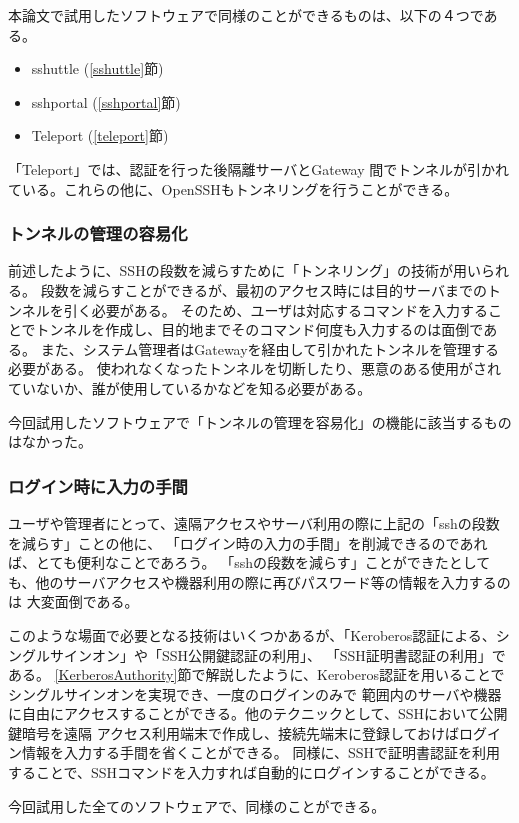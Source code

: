 \documentclass[11pt,a4j,titlepage]{jreport}
\begin{document}
\par 本論文で試用したソフトウェアで同様のことができるものは、以下の４つである。
\begin{itemize}
    \item sshuttle (\ref{sshuttle}節)
    \item sshportal (\ref{sshportal}節)
    \item Teleport (\ref{teleport}節)
\end{itemize}
「Teleport」では、認証を行った後隔離サーバとGateway
間でトンネルが引かれている。これらの他に、OpenSSHもトンネリングを行うことができる。


\subsubsection*{トンネルの管理の容易化}
前述したように、SSHの段数を減らすために「トンネリング」の技術が用いられる。
段数を減らすことができるが、最初のアクセス時には目的サーバまでのトンネルを引く必要がある。
そのため、ユーザは対応するコマンドを入力することでトンネルを作成し、目的地までそのコマンド何度も入力するのは面倒である。
また、システム管理者はGatewayを経由して引かれたトンネルを管理する必要がある。
使われなくなったトンネルを切断したり、悪意のある使用がされていないか、誰が使用しているかなどを知る必要がある。

今回試用したソフトウェアで「トンネルの管理を容易化」の機能に該当するものはなかった。


\subsubsection*{ログイン時に入力の手間}
ユーザや管理者にとって、遠隔アクセスやサーバ利用の際に上記の「sshの段数を減らす」ことの他に、
「ログイン時の入力の手間」を削減できるのであれば、とても便利なことであろう。
「sshの段数を減らす」ことができたとしても、他のサーバアクセスや機器利用の際に再びパスワード等の情報を入力するのは
大変面倒である。

このような場面で必要となる技術はいくつかあるが、「Keroberos認証による、シングルサインオン」や「SSH公開鍵認証の利用」、
「SSH証明書認証の利用」である。
\ref{KerberosAuthority}節で解説したように、Keroberos認証を用いることでシングルサインオンを実現でき、一度のログインのみで
範囲内のサーバや機器に自由にアクセスすることができる。他のテクニックとして、SSHにおいて公開鍵暗号を遠隔
アクセス利用端末で作成し、接続先端末に登録しておけばログイン情報を入力する手間を省くことができる。
同様に、SSHで証明書認証を利用することで、SSHコマンドを入力すれば自動的にログインすることができる。
\par 今回試用した全てのソフトウェアで、同様のことができる。
\end{document}
